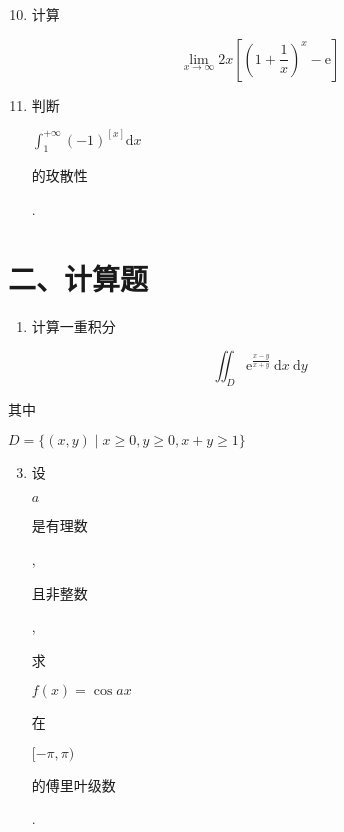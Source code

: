 \documentclass[10pt]{article}
\begin{document}
\begin{enumerate}
  \setcounter{enumi}{9}
  \item \begin{CJK}{UTF8}{mj}计算\end{CJK}
\end{enumerate}
$$
\lim _{x \rightarrow \infty} 2 x\left[\left(1+\frac{1}{x}\right)^{x}-\mathrm{e}\right]
$$

\begin{enumerate}
  \setcounter{enumi}{10}
  \item \begin{CJK}{UTF8}{mj}判断\end{CJK} $\int_{1}^{+\infty}(-1)^{[x]} \mathrm{d} x$ \begin{CJK}{UTF8}{mj}的玫散性\end{CJK}.
\end{enumerate}
\section{二、计算题}
\begin{enumerate}
  \item \begin{CJK}{UTF8}{mj}计算一重积分\end{CJK}
\end{enumerate}
$$
\iint_{D} \mathrm{e}^{\frac{x-y}{x+y}} \mathrm{~d} x \mathrm{~d} y
$$
\begin{CJK}{UTF8}{mj}其中\end{CJK} $D=\{(x, y) \mid x \geq 0, y \geq 0, x+y \geq 1\}$

\begin{enumerate}
  \setcounter{enumi}{2}
  \item \begin{CJK}{UTF8}{mj}设\end{CJK} $a$ \begin{CJK}{UTF8}{mj}是有理数\end{CJK}, \begin{CJK}{UTF8}{mj}且非整数\end{CJK}, \begin{CJK}{UTF8}{mj}求\end{CJK} $f(x)=\cos a x$ \begin{CJK}{UTF8}{mj}在\end{CJK} $[-\pi, \pi)$ \begin{CJK}{UTF8}{mj}的傅里叶级数\end{CJK}.
\end{enumerate}
\end{document}
